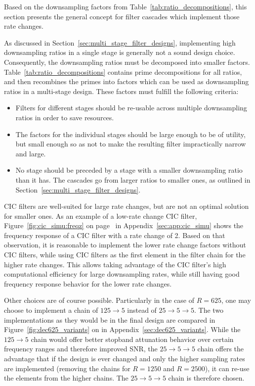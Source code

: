 Based on  the downsampling factors  from Table~\ref{tab:ratio_decompositions},
this section presents the general  concept for filter cascades which implement
those rate changes.

As  discussed  in  Section~\ref{sec:multi_stage_filter_designs},  implementing
high downsampling  ratios in a  single stage is  generally not a  sound design
choice. Consequently, the downsampling ratios  must be decomposed into smaller
factors. Table~\ref{tab:ratio_decompositions}  contains  prime  decompositions
for all ratios, and then recombines the  primes into factors which can be used
as downsampling  ratios in a  multi-stage design.  These factors  must fulfill
the following criteria:
\begin{itemize}\tightlist
    \item
        Filters  for  different stages  should  be  re-usable across  multiple
        downsampling ratios  in order  to save resources.
    \item
        The factors for the individual stages  should be large enough to be of
        utility,  but small  enough so  as not  to make  the resulting  filter
        impractically narrow and large.
    \item
        No stage  should be preceded  by a  stage with a  smaller downsampling
        ratio than it has. The cascades go from larger ratios to smaller ones,
        as outlined in Section~\ref{sec:multi_stage_filter_designs}.
\end{itemize}

CIC  filters  are  well-suited  for  large   rate  changes,  but  are  not  an
optimal solution  for smaller  ones. As an  example of  a low-rate  change CIC
filter,  Figure~\ref{fig:cic_simu:freqz} on  page~\pageref{fig:cic_simu:freqz}
in  Appendix~\ref{sec:app:cic_simu}  shows the  frequency  response  of a  CIC
filter  with a  rate change  of  \num{2}.  Based  on that  observation, it  is
reasonable to  implement the  lower rate change  factors without  CIC filters,
while using  CIC filters  as the  first element  in the  filter chain  for the
higher rate  changes. This allows  taking advantage of  the CIC  filter's high
computational efficiency for large downsampling rates, while still having good
frequency response behavior for the lower rate changes.

Other choices are of course possible. Particularly in the case of $R=625$, one
may  choose  to implement  a  chain  of $125  \rightarrow  5$  instead of  $25
\rightarrow  5 \rightarrow  5$.   The  two implementations  as  they would  be
in  the  final  design  are compared  in  Figure~\ref{fig:dec625_variants}  on
\pageref{fig:dec625_variants} in Appendix~\ref{sec:dec625_variants}. While the
$125 \rightarrow 5$ chain would offer better stopband attunation behavior over
certain frequency  ranges and  therefore improved SNR,  the $25  \rightarrow 5
\rightarrow 5$ chain  offers the advantage that if the  design is ever changed
and only  the higher sampling rates  are implemented (removing the  chains for
$R=1250$ and $R=2500$), it can re-use the elements from the higher chains. The
$25 \rightarrow  5 \rightarrow 5$  chain is  therefore chosen.

